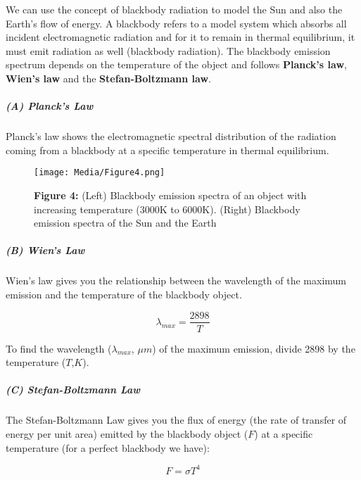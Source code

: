 \documentclass[
  letterpaper,
  DIV=11,
  numbers=noendperiod]{scrartcl}
\let\oldsubparagraph\subparagraph
\renewcommand{\subparagraph}[1]{\oldsubparagraph{#1}\mbox{}}
\begin{document}
We can use the concept of blackbody radiation to model the Sun and also
the Earth's flow of energy. A blackbody refers to a model system which
absorbs all incident electromagnetic radiation and for it to remain in
thermal equilibrium, it must emit radiation as well (blackbody
radiation). The blackbody emission spectrum depends on the temperature
of the object and follows \textbf{Planck's law}, \textbf{Wien's law} and
the \textbf{Stefan-Boltzmann law}.

\hypertarget{a-plancks-law}{%
\subparagraph{(A) Planck's Law}\label{a-plancks-law}}

Planck's law shows the electromagnetic spectral distribution of the
radiation coming from a blackbody at a specific temperature in thermal
equilibrium.

\begin{figure}

{\centering \texttt{[image: Media/Figure4.png]}

}

\caption{\textbf{Figure 4:} (Left) Blackbody emission spectra of an
object with increasing temperature (3000K to 6000K). (Right) Blackbody
emission spectra of the Sun and the Earth}

\end{figure}

\hypertarget{b-wiens-law}{%
\subparagraph{(B) Wien's Law}\label{b-wiens-law}}

Wien's law gives you the relationship between the wavelength of the
maximum emission and the temperature of the blackbody object.

\begin{equation}
\tag{1}
\lambda_{max} = \frac{2898}{T}
\end{equation}

To find the wavelength (\(\lambda_{max}\), \(\mu m\)) of the maximum
emission, divide 2898 by the temperature (\(T\),\(K\)).

\hypertarget{c-stefan-boltzmann-law}{%
\subparagraph{(C) Stefan-Boltzmann Law}\label{c-stefan-boltzmann-law}}

The Stefan-Boltzmann Law gives you the flux of energy (the rate of
transfer of energy per unit area) emitted by the blackbody object
(\(F\)) at a specific temperature (for a perfect blackbody we have):

\begin{equation}
\tag{2}
F = \sigma T^{4}
\end{equation}
\end{document}
